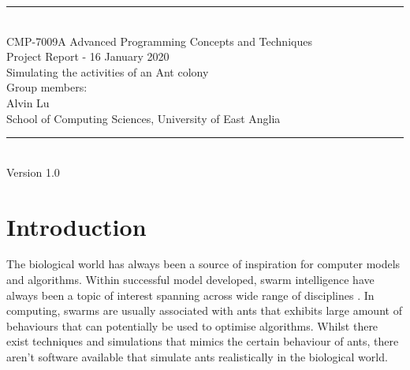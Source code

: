 \documentclass[a4paper, oneside, 11pt]{report}
\begin{document}
\begin{titlepage}
\begin{center}
\rule{12cm}{1mm} \\
\vspace{1cm}
{\large  CMP-7009A Advanced Programming Concepts and Techniques}
\vspace{7.5cm}
\\{\Large Project Report - 16 January 2020}
\vspace{1.5cm}
\\{\LARGE Simulating the activities of an Ant colony}
\vspace{1.0cm}
\\{\Large Group members: \\ Alvin Lu}
\vspace{10.0cm}
\\{\large School of Computing Sciences, University of East Anglia}
\\ \rule{12cm}{0.5mm}
\\ \hspace{8.5cm} {\large Version 1.0}
\end{center}
\end{titlepage}


\setcounter{page}{1}


\begin{abstract}
Ants have always been a popular animal that was researched for it's behaviour. Findings from it has benefited areas such as machine learning, algorithm discovery and server optimisation. This project aims to create a realistic ant simulator that can be used be researchers and educators to discover potential behaviours or run simple simulations for demonstrations and research. It used an intelligent ant path-finding algorithm that utilises surrounding pheromone data, distance from hive and individual memory. The result was an Ant simulator that provides customisation of various environmental and ant values that can be controlled at the users pace. The software is flexible, replicable and portable which promotes future expansion and reuse.
\end{abstract}

\chapter{Introduction}
\label{chap:intro}

The biological world has always been a source of inspiration for computer models and algorithms. Within successful model developed, swarm intelligence have always been a topic of interest spanning across wide range of disciplines \citep{Swarm_Intro}. In computing, swarms are usually associated with ants that exhibits large amount of behaviours that can potentially be used to optimise algorithms. Whilst there exist techniques and simulations \citep{Ant_Simulator} \citep{Ant_Simulator_Revisited} \citep{Ant_Simulator_Intro}  that mimics the certain behaviour of ants, there aren't software available that simulate ants realistically in  the biological world.
\end{document}
